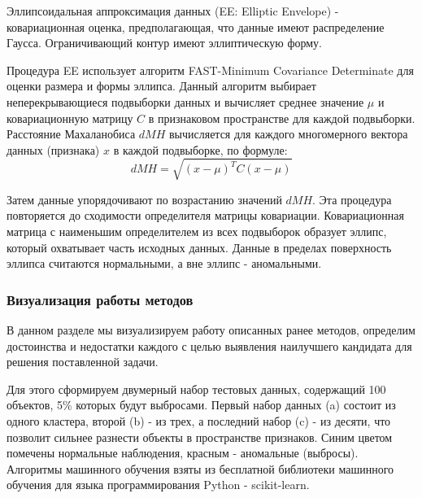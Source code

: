 \documentclass[12pt]{article}
\begin{document}
    \par Эллипсоидальная аппроксимация данных (EE: Elliptic Envelope) - ковариационная оценка, предполагающая, что данные имеют распределение Гаусса. Ограничивающий контур имеют эллиптическую форму.

    \par Процедура EE использует алгоритм FAST-Minimum Covariance Determinate для оценки размера и формы эллипса. Данный алгоритм выбирает неперекрывающиеся подвыборки данных и вычисляет среднее значение $\mu$ и ковариационную матрицу $C$ в признаковом пространстве для каждой подвыборки. Расстояние Махаланобиса $dMH$ вычисляется для каждого многомерного вектора данных (признака) $x$ в каждой подвыборке, по формуле:
    \begin{equation}
    \label{sec:Research:Model:EllipticEnvelope:formula:MahalanobisDistance}
        dMH = \sqrt{(x-\mu)^T C (x-\mu)}
    \end{equation}

    \noindent Затем данные упорядочивают по возрастанию значений $dMH$. Эта процедура повторяется до сходимости определителя матрицы ковариации. Ковариационная матрица с наименьшим определителем из всех подвыборок образует эллипс, который охватывает часть исходных данных. Данные в пределах поверхность эллипса считаются нормальными, а вне эллипс - аномальными.


    \subsubsection{Визуализация работы методов}
    \label{sec:Research:Model:Visualization}

    \par В данном разделе мы визуализируем работу описанных ранее методов, определим достоинства и недостатки каждого с целью выявления наилучшего кандидата для решения поставленной задачи.

    \par Для этого сформируем двумерный набор тестовых данных, содержащий 100 объектов, 5\% которых будут выбросами. Первый набор данных (a) состоит из одного кластера, второй (b) - из трех, а последний набор (c) - из десяти, что позволит сильнее разнести объекты в пространстве признаков. Синим цветом помечены нормальные наблюдения, красным - аномальные (выбросы). Алгоритмы машинного обучения взяты из бесплатной библиотеки машинного обучения для языка программирования Python - scikit-learn.
\end{document}
